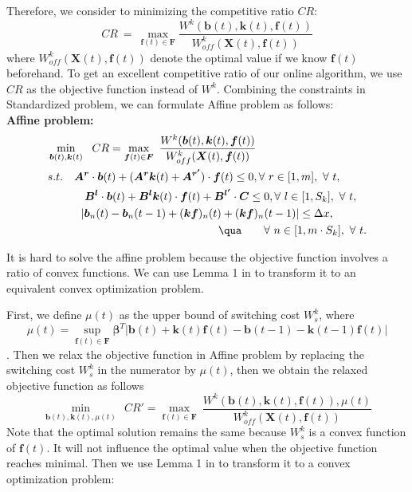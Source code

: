 \documentclass{acmtog}
\begin{document}
Therefore, we consider to minimizing the competitive ratio $CR$:
\vspace{-2ex}
$$CR~=~\max_{\bm{f}(t)\in\bm{F}}\frac{W^k(\bm{b}(t), \bm{k}(t) , \bm{f}(t))}{W^k_{off}(\bm{X}(t),\bm{f}(t))}$$
where $W^k_{off}(\bm{X}(t),\bm{f}(t))$ denote the optimal value if we know $\bm{f}(t)$ beforehand. To get an excellent competitive ratio of our online algorithm, we use $CR$ as the objective function instead of $W^k$. Combining the constraints in Standardized problem, we can formulate Affine problem as follows:\\

{\noindent\bf Affine problem: }\\
\begin{subequations}
\begin{align}
&\min_{\bm{b}(t),\bm{k}(t)}~~ CR=\max_{\bm{f}(t)\in\bm{F}}~\frac{W^k(\bm{b}(t), \bm{k}(t) , \bm{f}(t))}{W^k_{off}(\bm{X}(t),\bm{f}(t))}\quad\quad\quad~~ \\
& s.t.\quad\bm{A^r}\cdot\bm{b}(t)+(\bm{A^r}\bm{k}(t)+\bm{A^{r'}})\cdot\bm{f}(t)\leq 0,\forall~r\in[1,m],~\forall~t,\\
& \indent\indent~\bm{B^l}\cdot\bm{b}(t)+\bm{B^l}\bm{k}(t)\cdot\bm{f}(t)+ \bm{B^{l'}}\cdot \bm{C} \leq 0,\forall~l\in [1,S_k],~\forall~t,\\
& \indent\indent|\bm{b}_n(t)-\bm{b}_n(t-1)+(\bm{k}\bm{f})_n(t)+(\bm{k}\bm{f})_n(t-1)| \leq \Delta x,\\
&  ~\quad\quad\quad\quad\quad\quad\quad\quad\quad\quad\quad\quad\quad\quad\quad\qua\quad\quad\forall ~n\in [1,m\cdot S_k],~\forall~t.
\end{align}
\end{subequations}

It is hard to solve the affine problem because the objective function involves a ratio of convex functions. We can use Lemma 1 in \cite{c3} to  transform it to an equivalent convex optimization problem.


First, we define $\mu(t)$ as the upper bound of switching cost $W_s^k$, where
\begin{equation*}
  \mu(t)=\sup_{\bm{f}(t)\in \bm{F}}\bm{\beta}^T|\bm{b}(t)+\bm{k}(t)\bm{f}(t)-\bm{b}(t-1)-\bm{k}(t-1)\bm{f}(t)|
\end{equation*}
. Then we relax the objective function in Affine problem by replacing the switching cost $W_s^k$ in the numerator by $\mu(t)$, then we obtain the relaxed objective function as follows
\begin{equation}
  \min_{\bm{b}(t),\bm{k}(t),\mu(t)}~~ CR'=\max_{\bm{f}(t)\in\bm{F}}~\frac{W^k(\bm{b}(t), \bm{k}(t) , \bm{f}(t)),\mu(t)}{W^k_{off}(\bm{X}(t),\bm{f}(t))}
\end{equation}
Note that the optimal solution remains the same because $W_s^k$ is a convex function of $\bm{f}(t)$. It will not influence the optimal value when the objective function reaches minimal. Then we use Lemma 1 in \cite{c3} to transform it to a convex optimization problem:
\end{document}
